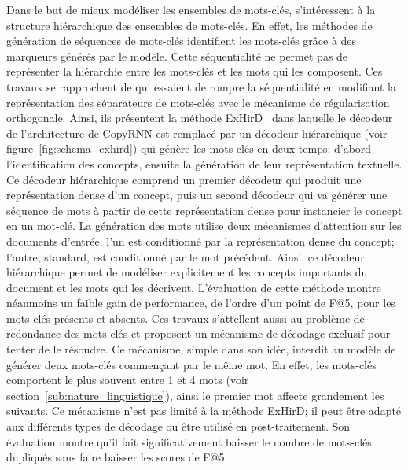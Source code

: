 Dans le but de mieux modéliser les ensembles de mots-clés, \citet{chen_exclusive_2020} s'intéressent à la structure hiérarchique des ensembles de mots-clés.
En effet, les méthodes de génération de séquences de mots-clés identifient les mots-clés grâce à des marqueurs générés par le modèle. Cette séquentialité ne permet pas de représenter la hiérarchie entre les mots-clés et les mots qui les composent.
Ces travaux se rapprochent de \citet{yuan_generating_2018} qui essaient de rompre la séquentialité en modifiant la représentation des séparateurs de mots-clés avec le mécanisme de régularisation orthogonale.
Ainsi, ils présentent la méthode ExHirD~\cite{chen_exclusive_2020} dans laquelle le décodeur de l'architecture de CopyRNN est remplacé par un décodeur hiérarchique (voir figure~\ref{fig:schema_exhird}) qui génère les mots-clés en deux temps: d'abord l'identification des concepts, ensuite la génération de leur représentation textuelle.
Ce décodeur hiérarchique comprend un premier décodeur qui produit une représentation dense d'un concept, puis un second décodeur qui va générer une séquence de mots à partir de cette représentation dense pour instancier le concept en un mot-clé.
La génération des mots utilise deux mécanismes d'attention sur les documents d'entrée: l'un est conditionné par la représentation dense du concept; l'autre, standard, est conditionné par le mot précédent.
Ainsi, ce décodeur hiérarchique permet de modéliser explicitement les concepts importants du document et les mots qui les décrivent.
%
L'évaluation de cette méthode montre néanmoins un faible gain de performance, de l'ordre d'un point de F@5, pour les mots-clés présents et absents.
%
Ces travaux s'attellent aussi au problème de redondance des mots-clés et proposent un mécanisme de décodage exclusif pour tenter de le résoudre.
Ce mécanisme, simple dans son idée, interdit au modèle de générer deux mots-clés commençant par le même mot.
En effet, les mots-clés comportent le plus souvent entre 1 et 4 mots (voir section~\ref{sub:nature_linguistique}), ainsi le premier mot affecte grandement les suivants.
Ce mécanisme n'est pas limité à la méthode ExHirD; il peut être adapté aux différents types de décodage ou être utilisé en post-traitement.
Son évaluation montre qu'il fait significativement baisser le nombre de mots-clés dupliqués sans faire baisser les scores de F@5.


